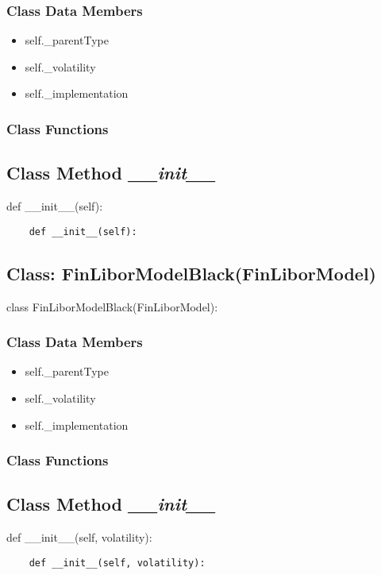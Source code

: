 \documentclass[twoside,11pt]{book}
\begin{document}
\subsubsection{Class Data Members}
\begin{itemize}
\item{self.\_parentType}
\item{self.\_volatility}
\item{self.\_implementation}
\end{itemize}

\subsubsection{Class Functions}

\subsection{Class Method {\it \_\_init\_\_}}
def \_\_init\_\_(self):

\begin{lstlisting}
    def __init__(self):
\end{lstlisting}

\subsection{Class: FinLiborModelBlack(FinLiborModel)}
class FinLiborModelBlack(FinLiborModel):

\subsubsection{Class Data Members}
\begin{itemize}
\item{self.\_parentType}
\item{self.\_volatility}
\item{self.\_implementation}
\end{itemize}

\subsubsection{Class Functions}

\subsection{Class Method {\it \_\_init\_\_}}
def \_\_init\_\_(self, volatility):

\begin{lstlisting}
    def __init__(self, volatility):
\end{lstlisting}
\end{document}
